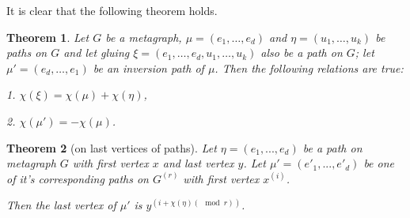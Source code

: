 \documentclass[14pt]{mmcs-article}
\newtheorem{theorem}{Theorem}
\begin{document}
It is clear that the following theorem holds.

\begin{theorem} \label{glued_paths}
    Let $G$ be a metagraph, $\mu = (e_1, \dots, e_d)$ and $\eta = (u_1, \dots, u_k)$ be paths on $G$ and let gluing $\xi = (e_1, \dots, e_d, u_1, \dots, u_k)$ also be a path on $G$; let $\mu' = (e_d, \dots, e_1)$ be an inversion path of $\mu$. Then the following relations are true:

    1. $ \chi(\xi) = \chi(\mu) + \chi(\eta)$,

    2. $ \chi(\mu') = -\chi(\mu)$.
\end{theorem}

\begin{theorem}[on last vertices of paths]\label{theorem_last_vertices}
    Let $\eta = (e_1, ..., e_d)$ be a path on metagraph $G$ with first vertex $x$ and last vertex $y$. Let $\mu' = (e'_1, ..., e'_d)$ be one of it's corresponding paths on $G^{(r)}$ with first vertex $x^{(i)}$.
    
    Then the last vertex of $\mu'$ is $y^{(i + \chi(\eta) (\mod{r}))}$.
    
\end{theorem}
    
\end{document}

